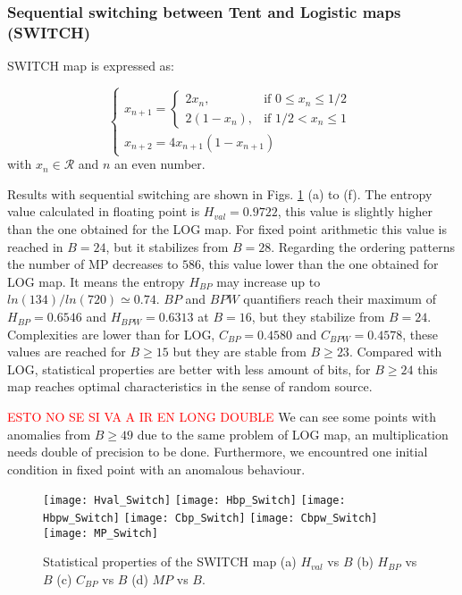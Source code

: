 \subsubsection{Sequential switching between Tent and Logistic maps (SWITCH)} \label{sssec:switch}

SWITCH map is expressed as:

\begin{equation}
\begin{cases}
	x_{n+1}=
	\begin{cases}
		2x_n, & \mbox{if } 0\leq x_n\leq 1/2 \\
		2(1-x_n ), & \mbox{if } 1/2<x_n\leq 1
	\end{cases} \\
	x_{n+2}=4x_{n+1}(1-x_{n+1})
\end{cases}\label{eq:SWITCH}
\end{equation}
with $x_n\in\mathcal{R}$ and $n$ an even number.

Results with sequential switching are shown in Figs. \ref{fig:SWITCH_QuantiB} (a) to (f).
The entropy value calculated in floating point is $H_{val}=0.9722$, this value is slightly higher than the one obtained for the LOG map. 
For fixed point arithmetic this value is reached in $B=24$, but it stabilizes from $B=28$.
Regarding the ordering patterns the number of MP decreases to $586$, this value lower than the one obtained for LOG map.
It means the entropy $H_{BP}$ may increase up to $ln(134)/ln(720)\simeq 0.74$.
$BP$ and $BPW$ quantifiers reach their maximum of $H_{BP}=0.6546$ and $H_{BPW}=0.6313$ at $B=16$, but they stabilize from $B=24$.
Complexities are lower than for LOG, $C_{BP}=0.4580$ and $C_{BPW}=0.4578$, these values are reached for $B \geq 15$ but they are stable from $B \geq 23$.
Compared with LOG, statistical properties are better with less amount of bits, for $B \geq 24$ this map reaches optimal characteristics in the sense of random source.

\textcolor{red}{ESTO NO SE SI VA A IR EN LONG DOUBLE}
We can see some points with anomalies from $B \geq 49$ due to the same problem of LOG map, an multiplication needs double of precision to be done.
Furthermore, we encountred one initial condition in fixed point with an anomalous behaviour.

\begin{figure}
	\texttt{[image: Hval\_Switch]}
	\texttt{[image: Hbp\_Switch]}
	\texttt{[image: Hbpw\_Switch]}
	\texttt{[image: Cbp\_Switch]}
	\texttt{[image: Cbpw\_Switch]}
	\texttt{[image: MP\_Switch]}
	\caption{Statistical properties of the SWITCH map (a) $H_{val}$ vs $B$ (b) $H_{BP}$ vs $B$ (c) $C_{BP}$ vs $B$ (d) $MP$ vs $B$.}
	\label{fig:SWITCH_QuantiB}
\end{figure}

